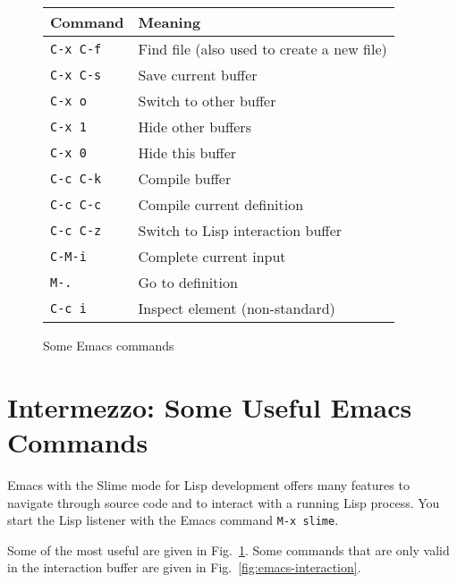 \documentclass[a4paper]{amsart}
\begin{document}
\begin{figure}[tp]
  \centering
  \begin{tabular}{|l|l|}
    \hline
    Command & Meaning \\
    \hline\hline
    \texttt{C-x C-f} & Find file (also used to create a new file)\\
    \hline
    \texttt{C-x C-s} & Save current buffer\\
    \hline\hline
    \texttt{C-x o} & Switch to other buffer\\
    \hline
    \texttt{C-x 1} & Hide other buffers\\
    \hline
    \texttt{C-x 0} & Hide this buffer\\
    \hline\hline
    \texttt{C-c C-k} & Compile buffer\\
    \hline
    \texttt{C-c C-c} & Compile current definition\\
    \hline
    \texttt{C-c C-z} & Switch to Lisp interaction buffer\\
    \hline
    \texttt{C-M-i} & Complete current input\\
    \hline
    \texttt{M-.} & Go to definition\\
    \hline
    \texttt{C-c i} & Inspect element (non-standard)\\
    \hline
  \end{tabular}
  \caption{Some Emacs commands}
  \label{fig:emacs-commands}
\end{figure}

\section{Intermezzo: Some Useful Emacs Commands }
\label{sec:emacs}

Emacs with the Slime mode for Lisp development offers many features to
navigate through source code and to interact with a running Lisp
process.  You start the Lisp listener with the Emacs command
\texttt{M-x slime}.

Some of the most useful are given in
Fig.~\ref{fig:emacs-commands}.  Some commands that are only valid in
the interaction buffer are given in Fig.~\ref{fig:emacs-interaction}.
\end{document}
